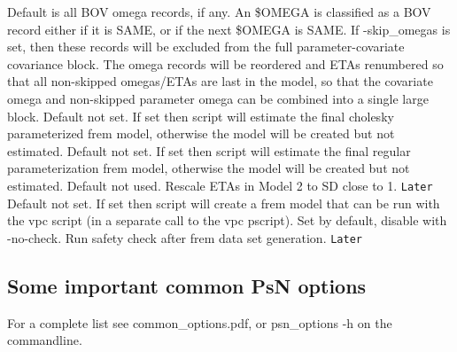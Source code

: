 \begin{optionlist}
{}
Default is all BOV omega records, if any.
An \$OMEGA is classified as a BOV record either if it is SAME, or if the next \$OMEGA is SAME. 
If -skip\_omegas is set,
then these records will be excluded from the full parameter-covariate covariance block.
The omega records will be reordered and ETAs renumbered so that all non-skipped
omegas/ETAs are last in the model, so that the covariate omega and non-skipped parameter omega
can be combined into a single large block.
\nextopt
{}
Default not set.
If set then script will estimate
the final cholesky parameterized frem model, otherwise the model will be
created but not estimated.
\nextopt
{}
Default not set.
If set then script will estimate
the final regular parameterization frem model, otherwise the model will be
created but not estimated.
\nextopt
{}
Default not used. Rescale ETAs in Model 2 to SD close to 1.%
\nextopt
{}
{\Large \texttt{Later}}
Default not set. If set then script will create a frem model that can be run with the vpc script (in a separate call to the vpc pscript).  
\nextopt
{}
Set by default, disable with -no-check. Run safety check after frem data set generation. 
\nextopt
{}
{\Large \texttt{Later}}

\end{optionlist}
\subsection{Some important common PsN options}
For a complete list see common\_options.pdf, 
or psn\_options -h on the commandline.



